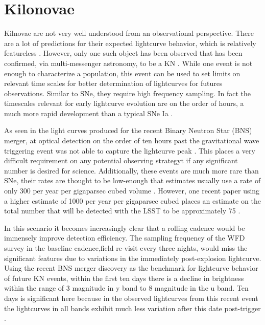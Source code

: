 \documentclass[12pt]{article}
\begin{document}
\section{Kilonovae} %
Kilnovae are not very well understood from an observational perspective. There are a lot of predictions for their expected lightcurve behavior, which is relatively featureless \citep{Rosswog2016a}. However, only one such object has been observed that has been confirmed, via multi-messenger astronomy, to be a KN \citep{Kasliwal2017}. While one event is not enough to characterize a population, this event can be used to set limits on relevant time scales for better determination of lightcurves for futures observations. Similar to SNe, they require high frequency sampling. In fact the timescales relevant for early lightcurve evolution are on the order of hours, a much more rapid development than a typical SNe Ia \citep{Villar2017}. \par
As seen in the light curves produced for the recent Binary Neutron Star (BNS) merger, at optical detection on the order of ten hours past the gravitational wave triggering event was not able to capture the lightcurve peak \citep{Villar2017}. This places a very difficult requirement on any potential observing strategyt if any significant number is desired for science. Additionally, these events are much more rare than SNe, their rates are thought to be low-enough that estimates usually use a rate of only 300 per year per gigaparsec cubed volume \citep{Rosswog2016a}. However, one recent paper using a higher estimate of 1000 per year per gigaparsec cubed places an estimate on the total number that will be detected with the LSST to be approximately 75 \citep{Scolnic2017}.\par
In this scenario it becomes increasingly clear that a rolling cadence would be immensely improve detection efficiency. The sampling frequency of the WFD survey in the baseline cadence,field re-visit every three nights, would miss the significant features due to variations in the immediately post-explosion lightcurve. Using the recent BNS merger discovery as the benchmark for lightcurve behavior of future KN events, within the first ten days there is a decline in brightness within the range of 3 magnitude in y band to 8 magnitude in the u band. Ten days is significant here because in the observed lightcurves from this recent event the lightcurves in all bands exhibit much less variation after this date post-trigger \citep{Villar2017}. \par
\end{document}
